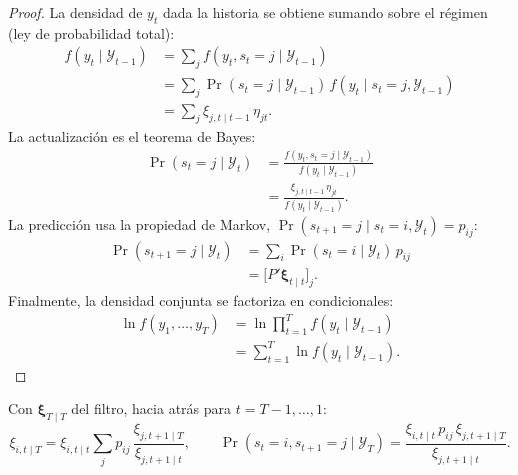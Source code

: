 \begin{proof}
La densidad de $y_t$ dada la historia se obtiene sumando sobre el régimen (ley de probabilidad total):
\begin{align*}
  f(y_t\mid\mathcal Y_{t-1}) &= \sum_j f(y_t,s_t=j\mid\mathcal Y_{t-1})\\
                             &= \sum_j\Pr(s_t=j\mid\mathcal Y_{t-1})\,f(y_t\mid s_t=j,\mathcal Y_{t-1})\\
                             &= \sum_j\xi_{j,t\mid t-1}\,\eta_{jt}.
\end{align*}
La actualización es el teorema de Bayes:
\begin{align*}
  \Pr(s_t=j\mid\mathcal Y_t) &= \frac{f(y_t,s_t=j\mid\mathcal Y_{t-1})}{f(y_t\mid\mathcal Y_{t-1})}\\
                             &= \frac{\xi_{j,t\mid t-1}\,\eta_{jt}}{f(y_t\mid\mathcal Y_{t-1})}.
\end{align*}
La predicción usa la propiedad de Markov, $\Pr(s_{t+1}=j\mid s_t=i,\mathcal Y_t)=p_{ij}$:
\begin{align*}
  \Pr(s_{t+1}=j\mid\mathcal Y_t) &= \sum_i\Pr(s_t=i\mid\mathcal Y_t)\,p_{ij}\\
                                 &= \bigl[P'\boldsymbol\xi_{t\mid t}\bigr]_j .
\end{align*}
Finalmente, la densidad conjunta se factoriza en condicionales:
\begin{align*}
  \ln f(y_1,\dots,y_T) &= \ln\prod_{t=1}^Tf(y_t\mid\mathcal Y_{t-1})\\
                       &= \sum_{t=1}^T\ln f(y_t\mid\mathcal Y_{t-1}).
\end{align*}
\end{proof}

\begin{proposicion}\label{prop:kim}
Con $\boldsymbol\xi_{T\mid T}$ del filtro, hacia atrás para $t=T-1,\dots,1$:
\[
  \xi_{i,t\mid T}=\xi_{i,t\mid t}\sum_j p_{ij}\,\frac{\xi_{j,t+1\mid T}}{\xi_{j,t+1\mid t}},\qquad
  \Pr(s_t=i,s_{t+1}=j\mid\mathcal Y_T)=\frac{\xi_{i,t\mid t}\,p_{ij}\,\xi_{j,t+1\mid T}}{\xi_{j,t+1\mid t}}.
\]
\end{proposicion}

